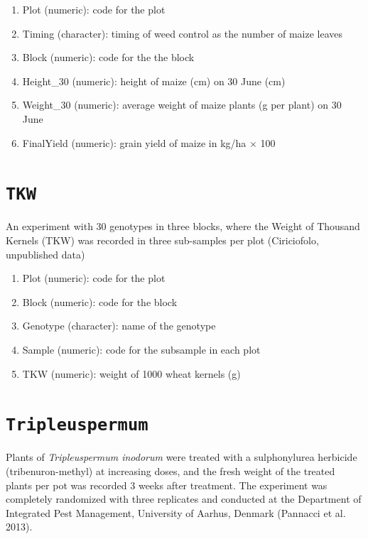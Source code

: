 \documentclass[
  letterpaper,
  DIV=11,
  numbers=noendperiod]{scrreprt}
\providecommand{\tightlist}{%
  \setlength{\itemsep}{0pt}\setlength{\parskip}{0pt}}
\begin{document}
\begin{enumerate}
\def\labelenumi{\arabic{enumi}.}
\tightlist
\item
  Plot (numeric): code for the plot
\item
  Timing (character): timing of weed control as the number of maize
  leaves
\item
  Block (numeric): code for the the block
\item
  Height\_30 (numeric): height of maize (cm) on 30 June (cm)
\item
  Weight\_30 (numeric): average weight of maize plants (g per plant) on
  30 June
\item
  FinalYield (numeric): grain yield of maize in kg/ha \(\times\) 100
\end{enumerate}

\section*{\texorpdfstring{\texttt{TKW}}{TKW}}\label{tkw}


An experiment with 30 genotypes in three blocks, where the Weight of
Thousand Kernels (TKW) was recorded in three sub-samples per plot
(Ciriciofolo, unpublished data)

\begin{enumerate}
\def\labelenumi{\arabic{enumi}.}
\tightlist
\item
  Plot (numeric): code for the plot
\item
  Block (numeric): code for the block
\item
  Genotype (character): name of the genotype
\item
  Sample (numeric): code for the subsample in each plot
\item
  TKW (numeric): weight of 1000 wheat kernels (g)
\end{enumerate}

\section*{\texorpdfstring{\texttt{Tripleuspermum}}{Tripleuspermum}}\label{tripleuspermum}


Plants of \emph{Tripleuspermum inodorum} were treated with a
sulphonylurea herbicide (tribenuron-methyl) at increasing doses, and the
fresh weight of the treated plants per pot was recorded 3 weeks after
treatment. The experiment was completely randomized with three
replicates and conducted at the Department of Integrated Pest
Management, University of Aarhus, Denmark (Pannacci et al. 2013).
\end{document}
